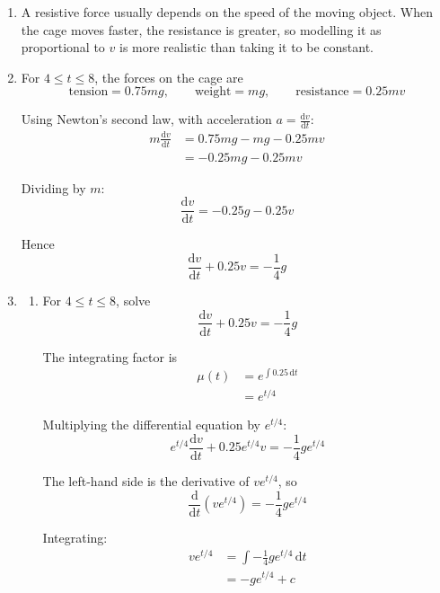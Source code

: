 \documentclass[leqno]{article}
\begin{document}
\begin{enumerate}[
  label=\textbf{\arabic*.},
  leftmargin=*,
  topsep=0pt,
  partopsep=0pt,
  parsep=0pt
]
\vspace*{10pt}

\begin{djsSolution}
\begin{enumerate}[label=\textbf{(\alph*)}]
  \item A resistive force usually depends on the speed of the moving object. When the cage moves faster, the resistance is greater, so modelling it as proportional to $v$ is more realistic than taking it to be constant.

  \item For $4 \le t \le 8$, the forces on the cage are
  \[
  \text{tension} = 0.75mg,\qquad \text{weight} = mg,\qquad \text{resistance} = 0.25mv
  \]

  Using Newton's second law, with acceleration $a=\frac{\mathrm{d}v}{\mathrm{d}t}$:
  \begin{align*}
  m\frac{\mathrm{d}v}{\mathrm{d}t} &= 0.75mg - mg - 0.25mv \\
  &= -0.25mg - 0.25mv
  \end{align*}

  Dividing by $m$:
  \[
  \frac{\mathrm{d}v}{\mathrm{d}t} = -0.25g - 0.25v
  \]

  Hence
  \[
  \frac{\mathrm{d}v}{\mathrm{d}t} + 0.25v = -\frac14 g
  \]

  \item
  \begin{enumerate}[label=(\roman*)]
    \item For $4 \le t \le 8$, solve
    \[
    \frac{\mathrm{d}v}{\mathrm{d}t} + 0.25v = -\frac14 g
    \]

    The integrating factor is
    \begin{align*}
    \mu(t)&=e^{\int 0.25\,\mathrm{d}t}\\
    &=e^{t/4}
    \end{align*}

    Multiplying the differential equation by $e^{t/4}$:
    \[
    e^{t/4}\frac{\mathrm{d}v}{\mathrm{d}t} + 0.25e^{t/4}v = -\frac14 ge^{t/4}
    \]

    The left-hand side is the derivative of $ve^{t/4}$, so
    \[
    \frac{\mathrm{d}}{\mathrm{d}t}\left(ve^{t/4}\right) = -\frac14 ge^{t/4}
    \]

    Integrating:
    \begin{align*}
    ve^{t/4} &= \int -\frac14 ge^{t/4}\, \mathrm{d}t \\
    &= -ge^{t/4} + c
    \end{align*}


\end{enumerate}
\end{enumerate}
\end{djsSolution}
\end{enumerate}
\end{document}
